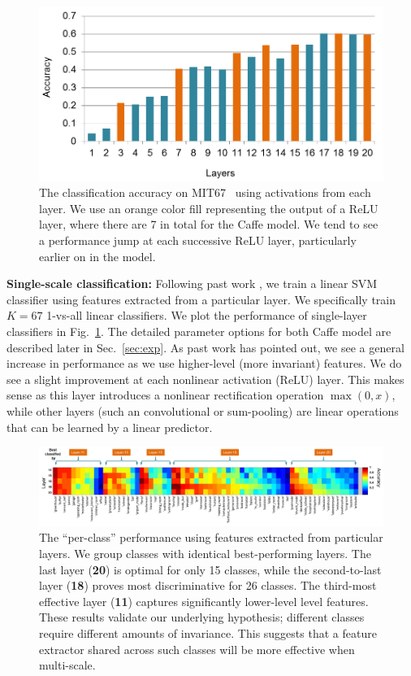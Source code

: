 \documentclass[10pt,twocolumn,letterpaper]{article}
\begin{document}
\begin{figure}[t!]
\centering
	\includegraphics[width=.9\columnwidth]{fig/fig_layer_caffe}

\caption{The classification accuracy on MIT67~\cite{MIT67} using activations from each layer. We use an orange color fill representing the output of a ReLU layer, where there are 7 in total for the Caffe model. We tend to see a performance jump at each successive ReLU layer, particularly earlier on in the model.}
\label{fig:layer_MIT67}
\end{figure}

{\bf Single-scale classification:} Following past work \cite{cnn_baseline}, we train a linear SVM classifier using features extracted from a particular layer. We specifically train $K=67$ 1-vs-all linear classifiers.
We plot the performance of single-layer classifiers in Fig.~\ref{fig:layer_MIT67}. The detailed parameter options for both Caffe model are described later in Sec.~\ref{sec:exp}. As past work has pointed out, we see a general increase in performance as we use higher-level (more invariant) features. We do see a slight improvement at each nonlinear activation (ReLU) layer. This makes sense as this layer introduces a nonlinear rectification operation $\max(0,x)$, while other layers (such an convolutional or sum-pooling) are linear operations that can be learned by a linear predictor.



\begin{figure}[ht!]
\centering
	\includegraphics[width=1\textwidth]{fig/fig_level_perf}
\caption{The ``per-class'' performance using features extracted from particular layers. We group classes with identical best-performing layers. The last layer ({\bf 20}) is optimal for only 15 classes, while the second-to-last layer ({\bf 18}) proves most discriminative for 26 classes. The third-most effective layer ({\bf 11}) captures significantly lower-level level features. These results validate our underlying hypothesis; different classes require different amounts of invariance. This suggests that a feature extractor shared across such classes will be more effective when multi-scale.}
\label{fig:level_perf}
\end{figure}
\end{document}
